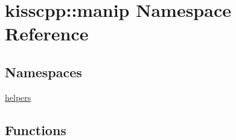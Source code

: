 \hypertarget{a00090}{\section{kisscpp\-:\-:manip Namespace Reference}
\label{a00090}
}
\subsection*{Namespaces}
\begin{DoxyCompactItemize}
\item 
\hyperlink{a00091}{helpers}
\end{DoxyCompactItemize}
\subsection*{Functions}
